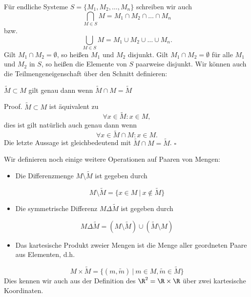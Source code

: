 \documentclass[letterpaper,10pt,english]{jupyterBook}
\begin{document}
Für endliche Systeme \(S=\{M_1,M_2,\ldots,M_n\}\) schreiben wir auch
\begin{equation*}
 \bigcap_{M \in S} M  = M_1 \cap M_2 \cap \ldots \cap M_n
\end{equation*}
bzw.
\begin{equation*}
 \bigcup_{M \in S} M  = M_1 \cup M_2 \cup \ldots \cup M_n.
\end{equation*}
Gilt \(M_1 \cap M_2 = \emptyset\), so heißen \(M_1\) und \(M_2\) disjunkt. Gilt \(M_1 \cap M_2 = \emptyset\) für alle \(M_1\) und \(M_2\) in \(S\), so heißen die Elemente von \(S\) paarweise disjunkt.
Wir können auch die Teilmengeneigenschaft über den Schnitt definieren:
\label{grundlagen/mengenlogik:lemma-2}
\begin{lemma}{}{}



\(\tilde M \subset M\) gilt genau dann wenn \(\tilde M \cap M = \tilde M\)
\end{lemma}

\begin{emphBox}{}{}
Proof. \(\tilde M  \subset M\) ist äquivalent zu
\begin{equation*}
 \forall x \in \tilde M: x \in M,
\end{equation*}
dies ist gilt natürlich auch genau dann wenn
\begin{equation*}
 \forall x \in \tilde M \cap M: x \in M.
\end{equation*}
Die letzte Aussage ist gleichbedeutend mit \(\tilde M \cap M = \tilde M\).
\(\square\)
\end{emphBox}

Wir definieren noch einige weitere Operationen auf Paaren von Mengen:
\begin{itemize}
\item {} 
Die Differenzmenge \(M \setminus \tilde M\) ist gegeben durch

\end{itemize}
\begin{equation*}
 M \setminus \tilde M = \{ x \in M ~|~ x \notin \tilde M\}
\end{equation*}\begin{itemize}
\item {} 
Die symmetrische Differenz \(M \Delta \tilde M\) ist gegeben durch

\end{itemize}
\begin{equation*}
 M \Delta \tilde M = (M \setminus \tilde M ) \cup (\tilde M \setminus M)
\end{equation*}\begin{itemize}
\item {} 
Das kartesische Produkt zweier Mengen ist die Menge aller geordneten Paare aus Elementen, d.h.

\end{itemize}
\begin{equation*}
 M \times \tilde M = \{ (m,\tilde m) ~|~ m \in M, \tilde m \in \tilde M\}
\end{equation*}
Dies kennen wir auch aus der Definition des \(\R^2 = \R \times \R\) über zwei kartesische Koordinaten.
\end{document}
